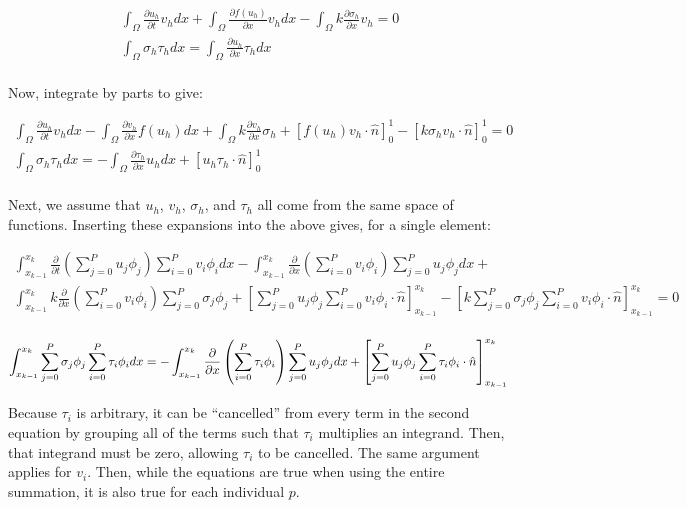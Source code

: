 \documentclass[10pt]{article}
\newcommand{\beq}{\begin{equation}}
\newcommand{\eeq}{\end{equation}}
\newcommand{\beqa}{\begin{equation}\begin{aligned}}
\newcommand{\eeqa}{\end{aligned}\end{equation}}
\begin{document}
\beqa
\int_{\Omega}\frac{\partial u_h}{\partial t}v_hdx+\int_{\Omega}\frac{\partial f(u_h)}{\partial x}v_hdx-\int_{\Omega}k\frac{\partial \sigma_h}{\partial x}v_h=0\\
\int_{\Omega}\sigma_h\tau_hdx=\int_{\Omega}\frac{\partial u_h}{\partial x}\tau_hdx\\
\eeqa

Now, integrate by parts to give:

\beqa
\int_{\Omega}\frac{\partial u_h}{\partial t}v_hdx-\int_{\Omega}\frac{\partial v_h}{\partial x}f(u_h)dx+\int_{\Omega}k\frac{\partial v_h}{\partial x}\sigma_h+\left\lbrack f(u_h)v_h\cdot\hat{n}\right\rbrack_0^1-\left\lbrack k\sigma_hv_h\cdot\hat{n}\right\rbrack_0^1=0\\
\int_{\Omega}\sigma_h\tau_hdx=-\int_{\Omega}\frac{\partial \tau_h}{\partial x}u_hdx+\left\lbrack u_h\tau_h\cdot\hat{n}\right\rbrack_0^1\\
\eeqa

Next, we assume that \(u_h\), \(v_h\), \(\sigma_h\), and \(\tau_h\) all come from the same space of functions. Inserting these expansions into the above gives, for a single element:

\beqa
\int_{x_{k-1}}^{x_k}\frac{\partial}{\partial t}\left(\sum_{j=0}^{P}u_j\phi_j\right)\sum_{i=0}^{P}v_i\phi_idx-\int_{x_{k-1}}^{x_k}\frac{\partial}{\partial x}\left(\sum_{i=0}^{P}v_i\phi_i\right)\sum_{j=0}^{P}u_j\phi_jdx+\quad\\
\int_{x_{k-1}}^{x_k}k\frac{\partial}{\partial x}\left(\sum_{i=0}^{P}v_i\phi_i\right)\sum_{j=0}^{P}\sigma_j\phi_j+\left\lbrack \sum_{j=0}^{P}u_j\phi_j\sum_{i=0}^{P}v_i\phi_i\cdot\hat{n}\right\rbrack_{x_{k-1}}^{x_k}-\left\lbrack k\sum_{j=0}^{P}\sigma_j\phi_j\sum_{i=0}^{P}v_i\phi_i\cdot\hat{n}\right\rbrack_{x_{k-1}}^{x_k}=0\\
\eeqa

\beq
\int_{x_{k-1}}^{x_k}\sum_{j=0}^{P}\sigma_j\phi_j\sum_{i=0}^{P}\tau_i\phi_idx=-\int_{x_{k-1}}^{x_k}\frac{\partial}{\partial x}\left(\sum_{i=0}^{P}\tau_i\phi_i\right)\sum_{j=0}^{P}u_j\phi_jdx+\left\lbrack \sum_{j=0}^{P}u_j\phi_j\sum_{i=0}^{P}\tau_i\phi_i\cdot\hat{n}\right\rbrack_{x_{k-1}}^{x_k}\\
\eeq

Because \(\tau_i\) is arbitrary, it can be ``cancelled'' from every term in the second equation by grouping all of the terms such that \(\tau_i\) multiplies an integrand. Then, that integrand must be zero, allowing \(\tau_i\) to be cancelled. The same argument applies for \(v_i\). Then, while the equations are true when using the entire summation, it is also true for each individual \(p\). 
\end{document}
